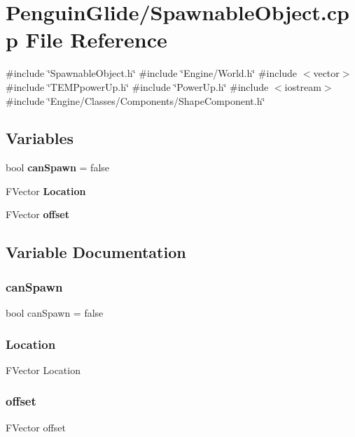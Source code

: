 \section{Penguin\+Glide/\+Spawnable\+Object.cpp File Reference}
\label{_spawnable_object_8cpp}
{\ttfamily \#include \char`\"{}Spawnable\+Object.\+h\char`\"{}}\newline
{\ttfamily \#include \char`\"{}Engine/\+World.\+h\char`\"{}}\newline
{\ttfamily \#include $<$vector$>$}\newline
{\ttfamily \#include \char`\"{}T\+E\+M\+Ppower\+Up.\+h\char`\"{}}\newline
{\ttfamily \#include \char`\"{}Power\+Up.\+h\char`\"{}}\newline
{\ttfamily \#include $<$iostream$>$}\newline
{\ttfamily \#include \char`\"{}Engine/\+Classes/\+Components/\+Shape\+Component.\+h\char`\"{}}\newline
\subsection*{Variables}
\begin{DoxyCompactItemize}
\item 
bool \textbf{ can\+Spawn} = false
\item 
F\+Vector \textbf{ Location}
\item 
F\+Vector \textbf{ offset}
\end{DoxyCompactItemize}


\subsection{Variable Documentation}
\mbox{\label{_spawnable_object_8cpp_aecb85274400d744fe1d94b98b73635c0}} 
\subsubsection{canSpawn}
{\footnotesize\ttfamily bool can\+Spawn = false}

\mbox{\label{_spawnable_object_8cpp_a080899170a985fbeb45d7602429cd18a}} 
\subsubsection{Location}
{\footnotesize\ttfamily F\+Vector Location}

\mbox{\label{_spawnable_object_8cpp_a4d53aab4c4591fa77bc5db184080aadb}} 
\subsubsection{offset}
{\footnotesize\ttfamily F\+Vector offset}

